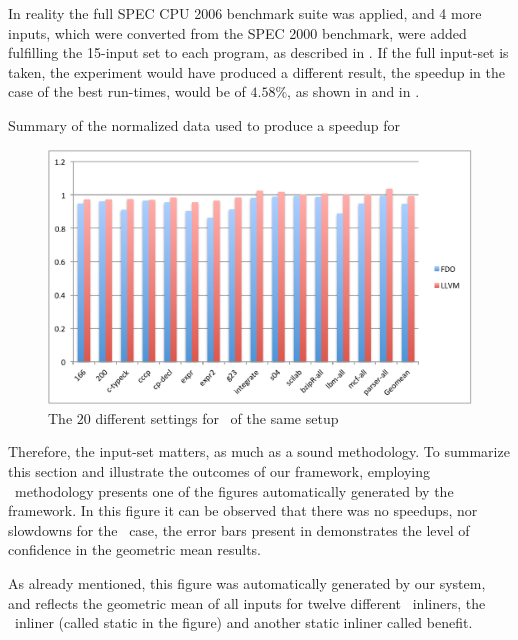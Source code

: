 In reality the full SPEC CPU 2006 benchmark suite was applied, and 4 more inputs, which were converted from the SPEC 2000 benchmark, were added fulfilling the 15-input set to each program, as described in . If the full input-set is taken, the experiment would have produced a different result, the speedup in the case of the best run-times, would be of $4.58 \%$, as shown in  and in .

\begin{table}
  \centering
  \begin{tiny}
  
  \end{tiny}
  \caption{Summary of the normalized data used to produce a speedup for \gcc}
  \label{tab:fullspeedup}
\end{table}

\begin{figure}
  \centering
  \includegraphics[width=1.00\linewidth]{Figures/speedupgccall}
  \caption{The $20$ different settings for \gcc\ of the same setup}
  \label{fig:gccall}
\end{figure}

Therefore, the input-set matters, as much as a sound methodology. To summarize this section and illustrate the outcomes of our framework, employing \CP\ methodology  presents one of the figures automatically generated by the framework. In this figure it can be observed that there was no speedups, nor slowdowns for the \gcc\ case, the error bars present in  demonstrates the level of confidence in the geometric mean results.

As already mentioned, this figure was automatically generated by our system, and reflects the geometric mean of all inputs for twelve different \FDI\ inliners, the \llvm\ inliner (called static in the figure) and another static inliner called benefit.

